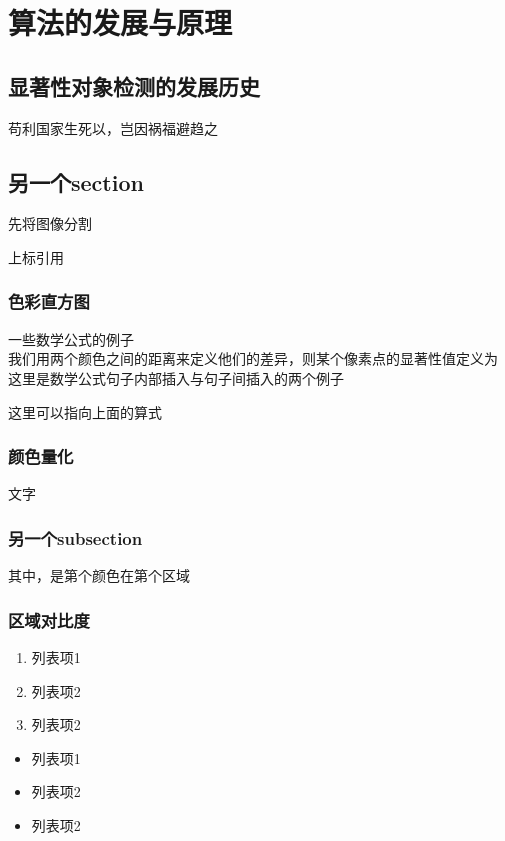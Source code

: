 \chapter{算法的发展与原理}

\section{显著性对象检测的发展历史}

苟利国家生死以，岂因祸福避趋之\cite{730558}
\section{另一个section}

先将图像分割 \cite{Felzenszwalb:2004:EGI:981793.981796}

上标引用

\subsection{色彩直方图}

一些数学公式的例子\\

我们用两个颜色之间的距离来定义他们的差异，则某个像素点的显著性值定义为
这里是数学公式句子内部插入与句子间插入的两个例子


这里可以指向上面的算式


\subsection{颜色量化}

文字

\subsection{另一个subsection}

其中，是第个颜色在第个区域


\subsection{区域对比度}

\begin{enumerate}
    \item 列表项1
    \item 列表项2
    \item 列表项2
\end{enumerate}

\begin{itemize}
    \item 列表项1
    \item 列表项2
    \item 列表项2
\end{itemize}